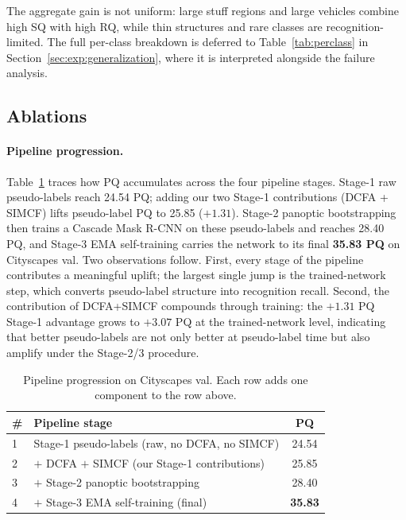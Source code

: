 \documentclass{article}
\begin{document}
The aggregate gain is not uniform: large stuff regions and large vehicles combine high SQ with high RQ, while thin structures and rare classes are recognition-limited. The full per-class breakdown is deferred to Table~\ref{tab:perclass} in Section~\ref{sec:exp:generalization}, where it is interpreted alongside the failure analysis.

\subsection{Ablations}
\label{sec:exp:ablations}

\paragraph{Pipeline progression.}
Table~\ref{tab:progression} traces how PQ accumulates across the four pipeline stages. Stage-1 raw pseudo-labels reach 24.54 PQ; adding our two Stage-1 contributions (DCFA + SIMCF) lifts pseudo-label PQ to 25.85 ($+1.31$). Stage-2 panoptic bootstrapping then trains a Cascade Mask R-CNN on these pseudo-labels and reaches 28.40 PQ, and Stage-3 EMA self-training carries the network to its final \textbf{35.83 PQ} on Cityscapes val. Two observations follow. First, every stage of the pipeline contributes a meaningful uplift; the largest single jump is the trained-network step, which converts pseudo-label structure into recognition recall. Second, the contribution of DCFA+SIMCF compounds through training: the $+1.31$ PQ Stage-1 advantage grows to $+3.07$ PQ at the trained-network level, indicating that better pseudo-labels are not only better at pseudo-label time but also amplify under the Stage-2/3 procedure.

\begin{table}[tbp]
\caption{Pipeline progression on Cityscapes val. Each row adds one component to the row above.}
\label{tab:progression}
\centering
\small
\setlength{\tabcolsep}{3pt}
\begin{tabular}{l l c}
\toprule
\# & Pipeline stage & PQ \\
\midrule
1 & Stage-1 pseudo-labels (raw, no DCFA, no SIMCF) & 24.54 \\
2 & \quad $+$ DCFA $+$ SIMCF (our Stage-1 contributions) & 25.85 \\
3 & \quad $+$ Stage-2 panoptic bootstrapping & 28.40 \\
4 & \quad $+$ Stage-3 EMA self-training (final) & \textbf{35.83} \\
\bottomrule
\end{tabular}
\end{table}
\end{document}
